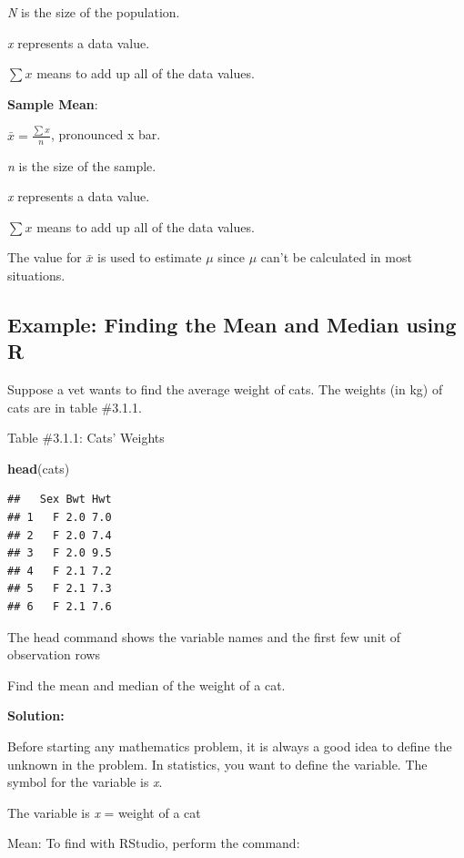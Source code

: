 \documentclass[
]{book}
\newenvironment{Shaded}{\begin{snugshade}}{\end{snugshade}}
\newcommand{\KeywordTok}[1]{\textcolor[rgb]{0.13,0.29,0.53}{\textbf{#1}}}
\newcommand{\NormalTok}[1]{#1}
\begin{document}
\emph{N} is the size of the population.

\emph{x} represents a data value.

\(\sum{x}\) means to add up all of the data values.

\textbf{Sample Mean}:

\(\bar{x}=\frac{\sum{x}}{n}\), pronounced x bar.

\emph{n} is the size of the sample.

\emph{x} represents a data value.

\(\sum{x}\) means to add up all of the data values.

The value for \(\bar{x}\) is used to estimate \(\mu\) since \(\mu\) can't be calculated in most situations.

\hypertarget{example-finding-the-mean-and-median-using-r}{%
\subsection{Example: Finding the Mean and Median using R}\label{example-finding-the-mean-and-median-using-r}}

Suppose a vet wants to find the average weight of cats. The weights (in kg) of cats are in table \#3.1.1.

Table \#3.1.1: Cats' Weights

\begin{Shaded}
\begin{Highlighting}[]
\KeywordTok{head}\NormalTok{(cats) }
\end{Highlighting}
\end{Shaded}

\begin{verbatim}
##   Sex Bwt Hwt
## 1   F 2.0 7.0
## 2   F 2.0 7.4
## 3   F 2.0 9.5
## 4   F 2.1 7.2
## 5   F 2.1 7.3
## 6   F 2.1 7.6
\end{verbatim}

The head command shows the variable names and the first few unit of observation rows

Find the mean and median of the weight of a cat.

\textbf{Solution:}

Before starting any mathematics problem, it is always a good idea to define the unknown in the problem. In statistics, you want to define the variable. The symbol for the variable is \emph{x}.

The variable is \emph{x} = weight of a cat

Mean:
To find with RStudio, perform the command:
\end{document}
